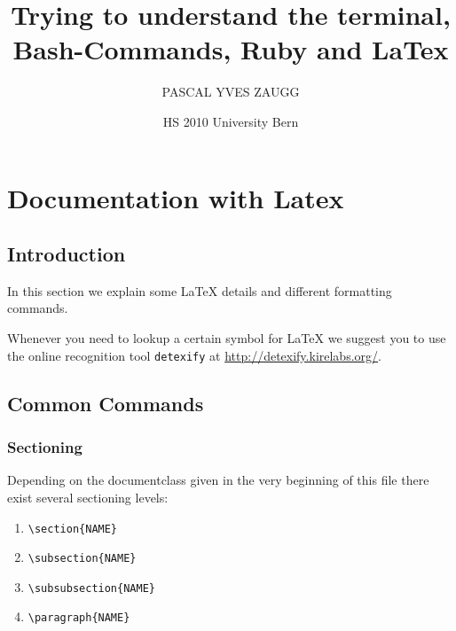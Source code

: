 \documentclass[10pt,a4paper]{scrartcl}
\date{HS 2010 University Bern}
\author{PASCAL YVES ZAUGG}
\title{Trying to understand the terminal, Bash-Commands, Ruby and LaTex}
\begin{document}
\maketitle

\tableofcontents

\newpage
\section{Documentation with Latex}
\subsection{Introduction} 

In this section we explain some \LaTeX\xspace details and different formatting
commands.

Whenever you need to lookup a certain symbol for \LaTeX\xspace we suggest you
to use the online recognition tool \texttt{detexify} at
\url{http://detexify.kirelabs.org/}.


\subsection{Common Commands}
\subsubsection{Sectioning}
Depending on the documentclass given in the very beginning of this file there
exist several sectioning levels:
\begin{enumerate}
\item{} \verb$\section{NAME}$
\item{} \verb$\subsection{NAME}$
\item{} \verb$\subsubsection{NAME}$
\item{} \verb$\paragraph{NAME}$
\end{enumerate}
\end{document}
